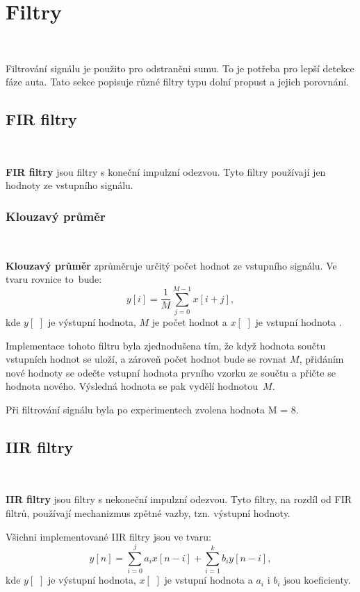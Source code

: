 \chapter{Filtry}
\label{sec:Filters}
\vspace{-30pt}
\

Filtrování signálu je použito pro odstraněni sumu. To je potřeba pro lepší detekce 
fáze auta. Tato sekce popisuje různé filtry typu dolní propust a jejich porovnání.

\section{FIR filtry}\

\textbf{FIR filtry} jsou filtry s koneční impulzní odezvou. Tyto filtry používají jen
hodnoty ze vstupního signálu\cite{FIR}.

\subsection{Klouzavý průměr}\

\textbf{Klouzavý průměr} zprůměruje určitý počet hodnot ze vstupního signálu. 
Ve tvaru rovnice to~bude:
\begin{equation}
y[i] = \frac{1}{M}\sum_{j = 0}^{M - 1}x[i+j],
\end{equation}
kde $y[\,\,]$ je výstupní hodnota, $M$ je počet hodnot a $x[\,\,]$ je vstupní hodnota
\cite{Filters}.

Implementace tohoto filtru byla zjednodušena tím, že když hodnota součtu vstupních 
hodnot se uloží, a zároveň počet hodnot bude se rovnat $M$, přidáním nové hodnoty 
se odečte vstupní hodnota prvního vzorku ze součtu a přičte se hodnota nového. 
Výsledná hodnota se pak vydělí hodnotou~$M$\cite{krokomer}.

Při filtrování signálu byla po experimentech zvolena hodnota M = 8.

\section{IIR filtry}\

\textbf{IIR filtry} jsou filtry s nekoneční impulzní odezvou. Tyto filtry, na rozdíl 
od FIR filtrů, používají mechanizmus zpětné vazby, tzn. výstupní hodnoty\cite{IIR}.

Všichni implementované IIR filtry jsou ve tvaru:
\begin{equation}
y[n] = \sum_{i = 0}^{j}a_{i}x[n - i] + \sum_{i = 1}^{k}b_{i}y[n - i],
\end{equation}
kde $y[\,\,]$ je výstupní hodnota, $x[\,\,]$ je vstupní hodnota a $a_i$ i $b_i$ 
jsou koeficienty.

